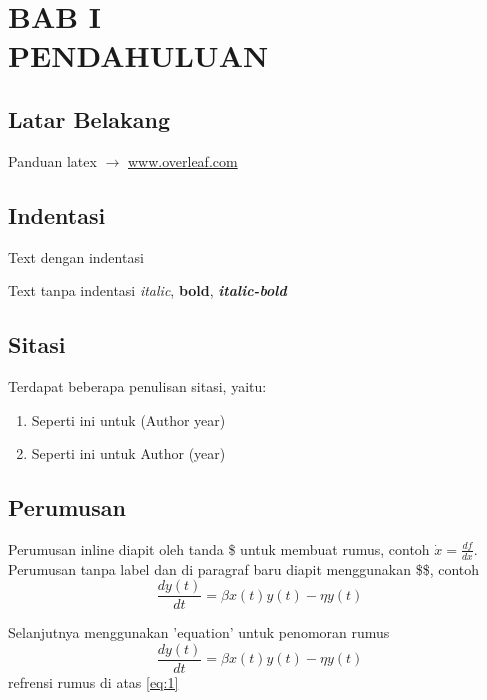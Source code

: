 \chapter*{BAB I\\PENDAHULUAN}
\thispagestyle{chapterfirstpage}

\section{Latar Belakang}
Panduan latex $\rightarrow$ \href{https://www.overleaf.com/learn/latex/Learn_LaTeX_in_30_minutes}{www.overleaf.com}
\section{Indentasi}
Text dengan indentasi \lipsum[1][1-3]

\noindent Text tanpa indentasi \lipsum[1][1-3]
\textit{italic}, \textbf{bold}, \textbf{\textit{italic-bold}}

\section{Sitasi}
\noindent Terdapat beberapa penulisan sitasi, yaitu:
\begin{enumerate}
    \item Seperti ini \parencite{Luschi2013} untuk (Author year)
    \item Seperti ini \textcite{Luschi2013} untuk Author (year)
\end{enumerate}


\section{Perumusan}
\noindent Perumusan inline diapit oleh tanda \$ untuk membuat rumus, contoh $\dot{x}=\frac{df}{dx}$.
\noindent Perumusan tanpa label dan di paragraf baru diapit menggunakan \$\$, contoh
$$
    \frac{dy(t)}{dt} = \beta x(t)y(t) - \eta y(t)
$$

\noindent Selanjutnya menggunakan 'equation' untuk penomoran rumus
\begin{equation}\label{eq:1}
    \frac{dy(t)}{dt} = \beta x(t)y(t) - \eta y(t)
\end{equation}
\noindent refrensi rumus di atas \eqref{eq:1}

